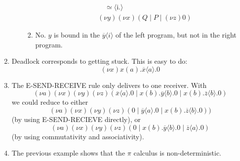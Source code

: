 \documentclass{article}
\begin{document}
\begin{enumerate}
\begin{enumerate}
\begin{enumerate}
\begin{align*}
              & \quad \simeq \langle \text{i.} \rangle \\
              & (\nu y)(\nu x)(Q \mid P \mid (\nu z)0)
            \end{align*}
          \item No. $y$ is bound in the $\overline y \langle i \rangle$ of the left program, but not in the right program.
        \end{enumerate}
    \end{enumerate}
  \item Deadlock corresponds to getting stuck. This is easy to do:
    $$(\nu x)x(a).\overline x \langle a \rangle.0$$
  \item The E-SEND-RECEIVE rule only delivers to one receiver. With
    $$(\nu a)(\nu x)(\nu y)(\nu z)(\overline x \langle a \rangle.0 \mid x(b).\overline y \langle b \rangle.0 \mid x(b).\overline z \langle b \rangle.0)$$
    we could reduce to either
    $$(\nu a)(\nu x)(\nu y)(\nu z)(0 \mid \overline y \langle a \rangle.0 \mid x(b).\overline z \langle b \rangle.0))$$
    (by using E-SEND-RECIEVE directly), or
    $$(\nu a)(\nu x)(\nu y)(\nu z)(0 \mid x(b).\overline y \langle b \rangle.0 \mid \overline z \langle a \rangle.0)$$
    (by using commutativity and associativity).
  \item The previous example shows that the $\pi$ calculus is non-deterministic.
\end{enumerate}
\end{document}
